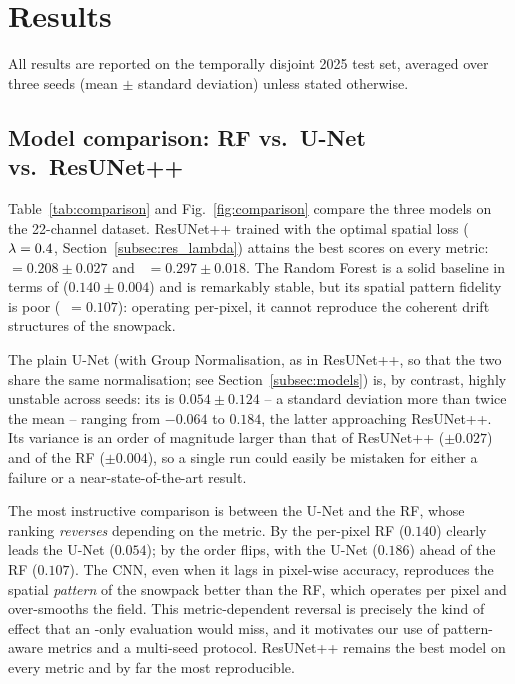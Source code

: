 \section{Results}
\label{sec:results}

All results are reported on the temporally disjoint 2025 test set, averaged
over three seeds (mean $\pm$ standard deviation) unless stated otherwise.

\subsection{Model comparison: RF vs.\ U-Net vs.\ ResUNet++}
\label{subsec:res_comparison}

Table~\ref{tab:comparison} and Fig.~\ref{fig:comparison} compare the three
models on the 22-channel
dataset. ResUNet++ trained with the optimal spatial loss ($\lambda=0.4$,
Section~\ref{subsec:res_lambda}) attains the best scores on every metric:
\Rsq{}~$=0.208\pm0.027$ and \SPAEF{}~$=0.297\pm0.018$. The Random Forest is a
solid baseline in terms of \Rsq{} ($0.140\pm0.004$) and is remarkably stable,
but its spatial pattern fidelity is poor (\SPAEF{}~$=0.107$): operating
per-pixel, it cannot reproduce the coherent drift structures of the snowpack.

The plain U-Net (with Group Normalisation, as in ResUNet++, so that the two
share the same normalisation; see Section~\ref{subsec:models}) is, by contrast,
highly unstable across seeds: its \Rsq{} is $0.054\pm0.124$ -- a standard
deviation more than twice the mean -- ranging from $-0.064$ to $0.184$, the
latter approaching ResUNet++. Its variance is an order of magnitude larger than
that of ResUNet++ ($\pm0.027$) and of the RF ($\pm0.004$), so a single run could
easily be mistaken for either a failure or a near-state-of-the-art result.

The most instructive comparison is between the U-Net and the RF, whose ranking
\emph{reverses} depending on the metric. By \Rsq{} the per-pixel RF ($0.140$)
clearly leads the U-Net ($0.054$); by \SPAEF{} the order flips, with the U-Net
($0.186$) ahead of the RF ($0.107$). The CNN, even when it lags in pixel-wise
accuracy, reproduces the spatial \emph{pattern} of the snowpack better than the
RF, which operates per pixel and over-smooths the field. This metric-dependent
reversal is precisely the kind of effect that an \Rsq{}-only evaluation would
miss, and it motivates our use of pattern-aware metrics and a multi-seed
protocol. ResUNet++ remains the best model on every metric and by far the most
reproducible.

